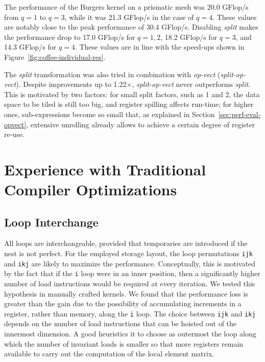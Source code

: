 The performance of the Burgers kernel on a prismatic mesh was 20.0 GFlop/s from $q=1$ to $q=3$, while it was 21.3 GFlop/s in the case of $q=4$. These values are notably close to the peak performance of 30.4 GFlop/s. Disabling \emph{split} makes the performance drop to 17.0 GFlop/s for $q=1, 2$, 18.2 GFlop/s for $q=3$,
and 14.3 GFlop/s for $q=4$. These values are in line with the speed-ups shown in Figure~\ref{fig:coffee-individual-res}.

The \emph{split} transformation was also tried in combination with \emph{op-vect} (\emph{split-op-vect}). Despite improvements up to 1.22$\times$, \emph{split-op-vect} never outperforms \emph{split}. This is motivated by two factors: for small split factors, such as 1 and 2, the data space to be tiled is still too big, and register spilling affects run-time; for higher ones, sub-expressions become so small that, as explained in Section~\ref{sec:perf-eval-opvect}, extensive unrolling already allows to achieve a certain degree of register re-use.


\section{Experience with Traditional Compiler Optimizations}
\label{sec:coffee-genpurp-opts}

\subsection{Loop Interchange}
\label{sec:coffee-genpurp-opts-interchange}
All loops are interchangeable, provided that temporaries are introduced if the nest is not perfect. For the employed storage layout, the loop permutations \texttt{ijk} and \texttt{ikj} are likely to maximize the performance. Conceptually, this is motivated by the fact that if the \texttt{i} loop were in an inner position, then a significantly higher number of load instructions would be required at every iteration. We tested this hypothesis in manually crafted kernels. We found that the performance loss is greater than the gain due to the possibility of accumulating increments in a register, rather than memory, along the \texttt{i} loop. The choice between \texttt{ijk} and \texttt{ikj} depends on the number of load instructions that can be hoisted out of the innermost dimension. A good heuristics it to choose as outermost the loop along which the number of invariant loads is smaller so that more registers remain available to carry out the computation of the local element matrix. 

